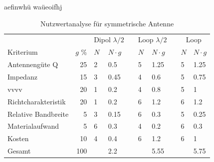 aefinwhü
waüeoifhj
\begin{table}[!ht]
  \centering
  \begin{tabular}{l r l l l l l l l l} \toprule 
  && \multicolumn{2}{c}{Dipol $\lambda/2$}   && \multicolumn{2}{c}{Loop $\lambda/2$}   && \multicolumn{2}{c}{Loop} \\ \cmidrule{3-4} \cmidrule{6-7} \cmidrule{9-10}
  Kriterium                  & $g$ \%  & $N$ & $N\cdot g$               && $N$ & $N\cdot g$                  && $N$ & $N\cdot g$ \\ \midrule
  Antennengüte Q            &  25             & 2   & 0.5               && 5   & 1.25                        && 5   & 1.25 \\
  Impedanz                  &  15             & 3   & 0.45              && 4   & 0.6                         && 5   & 0.75 \\
  vvvv    &  20             & 1   & 0.2               && 4   & 0.8                         && 5   & 1 \\
  Richtcharakteristik       &  20             & 1   & 0.2               && 6   & 1.2                         && 6   & 1.2 \\
  Relative Bandbreite       &   5             & 3   & 0.15              && 6   & 0.3                         && 5   & 0.25 \\
  Materialaufwand           &   5             & 6   & 0.3               && 4   & 0.2                         && 6   & 0.3 \\
  Kosten                    &  10             & 4   & 0.4               && 6   & 1.2                         && 6   & 1 \\
  Gesamt                    & 100             &     & 2.2               &&     & 5.55                        &&     & 5.75 \\ \bottomrule
  \end{tabular}
  \caption{Nutzwertanalyse für symmetrische Antenne}
  \label{nutzwertEvaluation}
\end{table}
\newpage 
\thispagestyle{empty}


